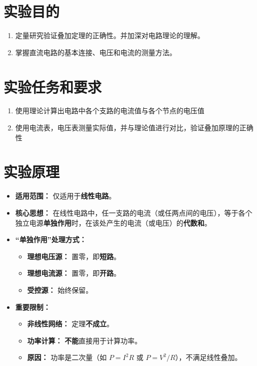 \documentclass{Report} %
\begin{document}
\makecover

\section{实验目的}
\begin{enumerate}
    \item 定量研究验证叠加定理的正确性。并加深对电路理论的理解。

    \item 掌握直流电路的基本连接、电压和电流的测量方法。
\end{enumerate}

\section{实验任务和要求}
\begin{enumerate}
    \item 使用理论计算出电路中各个支路的电流值与各个节点的电压值
    \item 使用电流表，电压表测量实际值，并与理论值进行对比，验证叠加原理的正确性
\end{enumerate}
\section{实验原理}
\begin{itemize}
    \item \textbf{适用范围：} 仅适用于\textbf{线性电路}。

    \item \textbf{核心思想：}
    在线性电路中，任一支路的电流（或任两点间的电压），等于各个独立电源\textbf{单独作用}时，在该处产生的电流（或电压）的\textbf{代数和}。

    \item \textbf{“单独作用”处理方式：}
    \begin{itemize}
        \item \textbf{理想电压源：} 置零，即\textbf{短路}。
        \item \textbf{理想电流源：} 置零，即\textbf{开路}。
        \item \textbf{受控源：} 始终保留。
    \end{itemize}

    \item \textbf{重要限制：}
    \begin{itemize}
        \item \textbf{非线性网络：} 定理\textbf{不成立}。
        \item \textbf{功率计算：} \textbf{不能}直接用于计算功率。
        \item \textbf{原因：} 功率是二次量（如 $P = I^2R$ 或 $P = V^2/R$），不满足线性叠加。
    \end{itemize}

\end{itemize}
\end{document}
